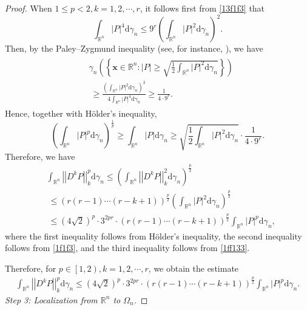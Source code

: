 \documentclass[12pt]{article}
\theoremstyle{plain}
\theoremstyle{definition}
\theoremstyle{remark}
\numberwithin{equation}{section}
\newcommand{\rr}{\mathbb{R}}
\begin{document}
\begin{proof}
When $1\leqslant p < 2,k=1,2,\cdots,r$, it follows first from \eqref{13f1f3} that
$$\int_{\mathbb{R}^{n}} \left\vert P \right\vert^{4} \mathrm{d} \gamma_{n} \leqslant 9^{r}\left( \int_{\mathbb{R}^{n}} \left| P \right|^{2} \mathrm{d} \gamma_{n} \right)^{2}.$$
Then, by the Paley--Zygmund inequality (see, for instance, \cite[Proposition~III.3, p.~23]{LQ17}), we have
\begin{eqnarray}\label{1ff133}
	\begin{aligned}
		&\gamma_{n} \left( \left\{ \textbf{x} \in \mathbb{R}^{n} :\left| P \right| \geqslant \sqrt{\frac{1}{2} \int_{\mathbb{R}^{n}} \left| P \right|^{2} \mathrm{d} \gamma_{n}} \right\} \right)\\ &\  \geqslant \frac{\left( \int_{\mathbb{R}^{n}} \left| P \right|^{2} \mathrm{d} \gamma_{n} \right)^{2}}{4\int_{\mathbb{R}^{n}} \left\vert P \right\vert^{4} \mathrm{d} \gamma_{n}} \geqslant \frac{1}{4\cdot 9^{r}}.\end{aligned}
\end{eqnarray}
Hence, together with Hölder's inequality,
$$\left( \int_{\mathbb{R}^{n}} \left| P \right|^{p} \mathrm{d} \gamma_{n} \right)^{\frac{1}{p}} \geqslant \int_{\mathbb{R}^{n}} \left| P \right| \mathrm{d} \gamma_{n} \geqslant \sqrt{\frac{1}{2} \int_{\mathbb{R}^{n}} \left| P \right|^{2} \mathrm{d} \gamma_{n}} \cdot \frac{1}{4\cdot 9^{r}}.$$
Therefore, we have
$$\begin{aligned}
	&\int_{\mathbb{R}^{n}} \left| \left| D^{k}P \right| \right|_{k}^{p} \mathrm{d} \gamma_{n} \leqslant \left( \int_{\mathbb{R}^{n}} \left| \left| D^{k}P \right| \right|_{k}^{2} \mathrm{d} \gamma_{n} \right)^{\frac{p}{2}}\\ &\  \leqslant \left( r\left( r-1 \right) \cdots \left( r-k+1 \right) \right)^{\frac{p}{2}} \left( \int_{\mathbb{R}^{n}} \left\vert P \right\vert^{2} \mathrm{d} \gamma_{n} \right)^{\frac{p}{2}}\\ &\  \leqslant \left( 4\sqrt{2} \right)^{p} \cdot 3^{2pr}\cdot \left( r\left( r-1 \right) \cdots \left( r-k+1 \right) \right)^{\frac{p}{2}} \int_{\mathbb{R}^{n}} \left\vert P \right\vert^{p} \mathrm{d} \gamma_{n},\end{aligned}$$
where the first inequality follows from Hölder's inequality, the second inequality follows from \eqref{1f1f3}, and the third inequality follows from \eqref{1ff133}.

Therefore, for $p\in \left[ 1,2 \right),k=1,2,\cdots ,r$, we obtain the estimate
\begin{eqnarray}
	\int_{\mathbb{R}^{n}} \left| \left| D^{k}P \right| \right|_{k}^{p} \mathrm{d} \gamma_{n} \leqslant \left( 4\sqrt{2} \right)^{p} \cdot 3^{2pr}\cdot\left( r\left( r-1 \right) \cdots \left( r-k+1 \right) \right)^{\frac{p}{2}} \int_{\mathbb{R}^{n}} \left| P \right|^{p} \mathrm{d} \gamma_{n}.\label{12}
\end{eqnarray}
\medskip\noindent\textit{Step 3: Localization from $\rr^n$ to $\Omega_n$.}
	

\end{proof}
\end{document}
